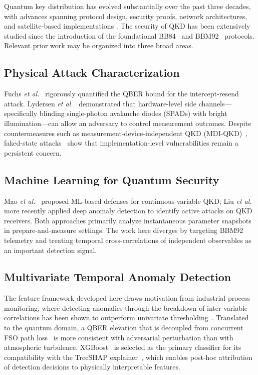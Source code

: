 \documentclass[conference]{IEEEtran}
\begin{document}
Quantum key distribution has evolved substantially over the past three decades, with advances spanning protocol design, security proofs, network architectures, and satellite-based implementations \cite{pirandola2020advances}. The security of QKD has been extensively studied since the introduction of the foundational BB84~\cite{bennett1984quantum} and BBM92~\cite{bennett1992quantum} protocols. Relevant prior work may be organized into three broad areas.

\subsection{Physical Attack Characterization}

Fuchs \textit{et al.}~\cite{fuchs1997optimal} rigorously quantified the QBER bound for the intercept-resend attack. Lydersen \textit{et al.}~\cite{lydersen2010hacking} demonstrated that hardware-level side channels---specifically blinding single-photon avalanche diodes (SPADs) with bright illumination---can allow an adversary to control measurement outcomes. Despite countermeasures such as measurement-device-independent QKD (MDI-QKD)~\cite{lo2012measurement}, faked-state attacks~\cite{makarov2005faked,gerhardt2011fullfield} show that implementation-level vulnerabilities remain a persistent concern.

\subsection{Machine Learning for Quantum Security}

Mao \textit{et al.}~\cite{mao2020detecting} proposed ML-based defenses for continuous-variable QKD; Liu \textit{et al.}~\cite{liu2025deep} more recently applied deep anomaly detection to identify active attacks on QKD receivers. Both approaches primarily analyze instantaneous parameter snapshots in prepare-and-measure settings. The work here diverges by targeting BBM92 telemetry and treating temporal cross-correlations of independent observables as an important detection signal.

\subsection{Multivariate Temporal Anomaly Detection}

The feature framework developed here draws motivation from industrial process monitoring, where detecting anomalies through the breakdown of inter-variable correlations has been shown to outperform univariate thresholding~\cite{chandola2009anomaly,ge2013multivariate}. Translated to the quantum domain, a QBER elevation that is decoupled from concurrent FSO path loss~\cite{bedington2017progress} is more consistent with adversarial perturbation than with atmospheric turbulence. XGBoost~\cite{chen2016xgboost} is selected as the primary classifier for its compatibility with the TreeSHAP explainer~\cite{lundberg2017shap}, which enables post-hoc attribution of detection decisions to physically interpretable features.
\end{document}
